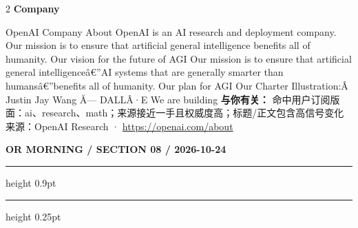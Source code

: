 \documentclass[10.5pt]{ctexart}
\begin{document}
\begin{multicols}{2}
\vspace{2mm}
{\large\bfseries Company}\par
OpenAI Company About OpenAI is an AI research and deployment company. Our mission is to ensure that artificial general intelligence benefits all of humanity. Our vision for the future of AGI Our mission is to ensure that artificial general intelligenceâ€”AI systems that are generally smarter than humansâ€”benefits all of humanity. Our plan for AGI Our Charter Illustration:Â Justin Jay Wang Ă— DALLÂ·E We are building 
\textbf{与你有关：} 命中用户订阅版面：ai、research、math；来源接近一手且权威度高；标题/正文包含高信号变化
{\footnotesize\color{ormuted} 来源：OpenAI Research · \url{https://openai.com/about}}
\end{multicols}
\newpage
{\small\bfseries OR MORNING / SECTION 08 / 2026-10-24}
\vspace{2mm}
\hrule height 0.9pt
\vspace{1.5mm}
\hrule height 0.25pt
\vspace{4mm}
\end{document}
